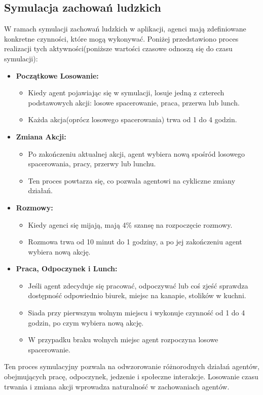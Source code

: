 \subsection{\textbf{Symulacja zachowań ludzkich}}
W ramach symulacji zachowań ludzkich w aplikacji, agenci mają zdefiniowane konkretne czynności, które mogą wykonywać. Poniżej przedstawiono proces realizacji tych aktywności(poniższe wartości czasowe odnoszą się do czasu symulacji):

\begin{itemize}
	\item \textbf{Początkowe Losowanie:}
	\begin{itemize}
		\item Kiedy agent pojawiając się w symulacji, losuje jedną z czterech podstawowych akcji: losowe spacerowanie, praca, przerwa lub lunch.
		\item Każda akcja(oprócz losowego spacerowania) trwa od 1 do 4 godzin.
	\end{itemize}
	
	\item \textbf{Zmiana Akcji:}
	\begin{itemize}
		\item Po zakończeniu aktualnej akcji, agent wybiera nową spośród losowego spacerowania, pracy, przerwy lub lunchu.
		\item Ten proces powtarza się, co pozwala agentowi na cykliczne zmiany działań.
	\end{itemize}
	
	\item \textbf{Rozmowy:}
	\begin{itemize}
		\item Kiedy agenci się mijają, mają 4\% szansę na rozpoczęcie rozmowy.
		\item Rozmowa trwa od 10 minut do 1 godziny, a po jej zakończeniu agent wybiera nową akcję.
	\end{itemize}
	
	\item \textbf{Praca, Odpoczynek i Lunch:}
	\begin{itemize}
		\item Jeśli agent zdecyduje się pracować, odpoczywać lub coś zjeść sprawdza dostępność odpowiednio biurek, miejsc na kanapie, stolików w kuchni.
		\item Siada przy pierwszym wolnym miejscu i wykonuje czynność od 1 do 4 godzin, po czym wybiera nową akcję.
		\item W przypadku braku wolnych miejsc agent rozpoczyna losowe spacerowanie.
	\end{itemize}
\end{itemize}

Ten proces symulacyjny pozwala na odwzorowanie różnorodnych działań agentów, obejmujących pracę, odpoczynek, jedzenie i społeczne interakcje. Losowanie czasu trwania i zmiana akcji wprowadza naturalność w zachowaniach agentów.



